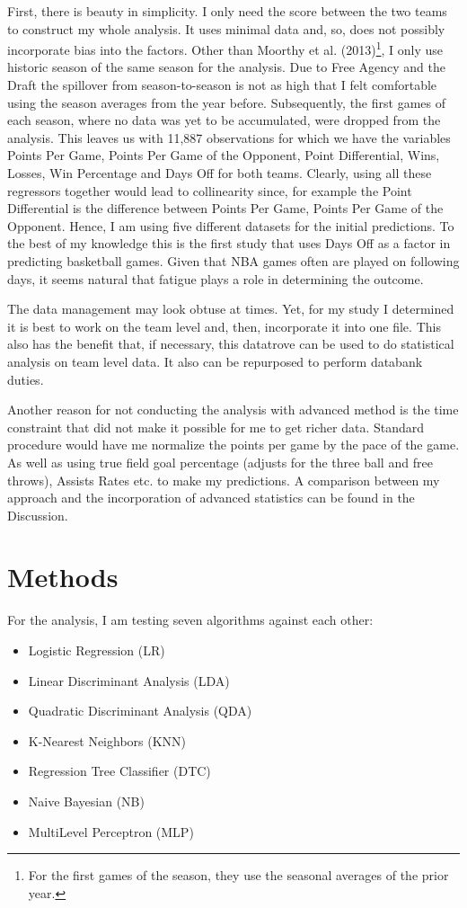 \documentclass[11pt,a4paper,leqno]{article}
\begin{document}
First, there is beauty in simplicity. I only need the score between the two teams to construct my whole analysis. It uses minimal data and, so, does not possibly  incorporate bias into the factors.
Other than Moorthy et al. (2013)\footnote{For the first games of the season, they use the seasonal averages of the prior year.},  I only use historic season of the same season for the analysis. Due to Free Agency and the Draft the spillover from season-to-season is not as high that I felt comfortable using the season averages from the year before. Subsequently, the first games of each season, where no data was yet to be accumulated, were dropped from the analysis. This leaves us with 11,887 observations for which we have the variables  Points Per Game, Points Per Game of the Opponent, Point Differential, Wins, Losses, Win Percentage and Days Off for both teams. Clearly, using all these regressors together would lead to collinearity since, for example the Point Differential is the difference between Points Per Game, Points Per Game of the Opponent. Hence, I am using five different datasets for the initial predictions. To the best of my knowledge this is the first study that uses Days Off as a factor in predicting basketball games. Given that NBA games often are played on following days, it seems natural that fatigue plays a role in determining the outcome.

The data management may look obtuse at times. Yet, for my study I determined it is best to work on the team level and, then, incorporate it into one file. This also has the benefit that, if necessary, this datatrove can be used to do statistical analysis on team level data. It also can be repurposed to perform databank duties.

Another reason for not conducting the analysis with advanced method is the time constraint that did not make it possible for me to get richer data. Standard procedure would have me normalize the points per game by the pace of the game. As well as using true field goal percentage (adjusts for the three ball and free throws), Assists Rates etc. to make my predictions. A comparison between my approach and the incorporation of  advanced statistics can be found in the Discussion.

\section{Methods}

For the analysis, I am testing seven algorithms against each other: \\
\begin{itemize}
\setlength\itemsep{0.1em}
\item Logistic Regression (LR)
\item Linear Discriminant Analysis (LDA)
\item Quadratic Discriminant Analysis (QDA)
\item K-Nearest Neighbors (KNN)
\item Regression Tree Classifier (DTC)
\item Naive Bayesian (NB)
\item Multi\-Level Perceptron (MLP)
\end{itemize}
\end{document}
